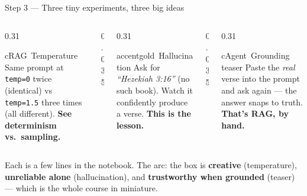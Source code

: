 \begin{frame}{Step 3 --- Three tiny experiments, three big ideas}
  \begin{columns}[t, totalwidth=\textwidth]
    \begin{column}{0.31\textwidth}
      \begin{featbox}{cRAG}{\faThermometerHalf\ Temperature}
        \scriptsize Same prompt at \texttt{temp=0} twice (identical) vs \texttt{temp=1.5}
        three times (all different). \textbf{See determinism vs.\ sampling.}
      \end{featbox}
    \end{column}
    \begin{column}{0.035\textwidth}\end{column}
    \begin{column}{0.31\textwidth}
      \begin{featbox}{accentgold}{\faGhost\ Hallucination}
        \scriptsize Ask for \emph{``Hezekiah 3:16''} (no such book). Watch it
        confidently produce a verse. \textbf{This is the lesson.}
      \end{featbox}
    \end{column}
    \begin{column}{0.035\textwidth}\end{column}
    \begin{column}{0.31\textwidth}
      \begin{featbox}{cAgent}{\faVectorSquare\ Grounding teaser}
        \scriptsize Paste the \emph{real} verse into the prompt and ask again ---
        the answer snaps to truth. \textbf{That's RAG, by hand.}
      \end{featbox}
    \end{column}
  \end{columns}
  \vspace{12pt}
  \begin{center}
  \begin{minipage}{0.9\textwidth}\small
    Each is a few lines in the notebook. The arc: the box is \textbf{creative}
    (temperature), \textbf{unreliable alone} (hallucination), and \textbf{trustworthy
    when grounded} (teaser) --- which is the whole course in miniature.
  \end{minipage}
  \end{center}
\end{frame}


